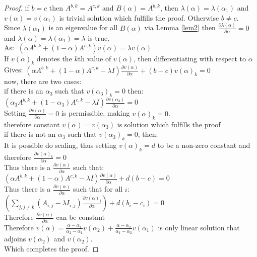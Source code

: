 \begin{proof}
if $b=c$ then $A^{b,k}=A^{c,k}$ and $B(\alpha) = A^{b,k}$, then $\lambda(\alpha)=\lambda(\alpha_1)$ and $v(\alpha)=v(\alpha_1)$ is trivial solution which fulfills the proof. Otherwise $b\ne c$.\\
Since $\lambda(\alpha_1)$ is an eigenvalue for all $B(\alpha)$ via Lemma \ref{lem2} then $\frac{\partial \lambda(\alpha)}{\partial \alpha}=0$ and $\lambda(\alpha)=\lambda(\alpha_1)=\lambda$ is true.\\
As: $~\left(\alpha A^{b,k} + (1-\alpha)A^{c,k}\right)v(\alpha)=\lambda v(\alpha)$\\
If $v(\alpha)_k$ denotes the $k$th value of $v(\alpha)$, then differentiating with respect to $\alpha$ \\
Gives: $\left(\alpha A^{b,k} + (1-\alpha)A^{c,k} - \lambda I\right)\frac{\partial v(\alpha)}{\partial\alpha}+(b-c)v(\alpha)_k=0$\\
now, there are two cases:\\
if there is an $\alpha_3$ such that $v(\alpha_3)_k=0$ then:\\
\-\hspace{8mm}$\left(\alpha_3 A^{b,k} + (1-\alpha_3)A^{c,k} - \lambda I\right)\frac{\partial v(\alpha_3)}{\partial\alpha}=0$\\
\-\hspace{8mm}Setting $\frac{\partial v(\alpha)}{\partial\alpha}=0$ is permissible, making $v(\alpha)_k=0$.\\
\-\hspace{8mm}therefore constant $v(\alpha)=v(\alpha_3)$ is solution which fulfills the proof\\
if there is not an $\alpha_3$ such that $v(\alpha_3)_k=0$, then:\\
\-\hspace{8mm}It is possible do scaling, thus setting $v(\alpha)_k=d$ to be a non-zero constant and therefore $\frac{\partial v(\alpha)_k}{\partial \alpha}=0$\\
\-\hspace{8mm}Thus there is a $\frac{\partial v(\alpha)}{\partial\alpha}$ such that: $\left(\alpha A^{b,k} + (1-\alpha)A^{c,k} - \lambda I\right)\frac{\partial v(\alpha)}{\partial\alpha}+d(b-c)=0$\\
\-\hspace{8mm}Thus there is a $\frac{\partial v(\alpha)}{\partial\alpha}$ such that for all $i$: $\left(\sum_{j,j\ne k}\left(A_{i,j}-\lambda I_{i,j}\right)\frac{\partial v(\alpha)_j}{\partial\alpha}\right) +d(b_i-c_i)=0 $\\
\-\hspace{8mm}Therefore $\frac{\partial v(\alpha)}{\partial\alpha}$ can be constant\\
\-\hspace{8mm}Therefore $v(\alpha)=\frac{\alpha-\alpha_1}{\alpha_2-\alpha_1}v(\alpha_2)+\frac{\alpha-\alpha_2}{\alpha_1-\alpha_2}v(\alpha_1)$ is only linear solution that adjoins $v(\alpha_2)$ and $v(\alpha_2)$.\\
Which completes the proof.
\end{proof}



